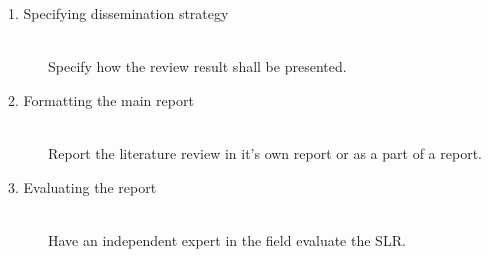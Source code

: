\begin{description}

	\item[1. Specifying dissemination strategy] \hfill \\
		Specify how the review result shall be presented. 

	\item[2. Formatting the main report] \hfill \\
		Report the literature review in it's own report or as a part of a report.

	\item[3. Evaluating the report] \hfill \\
		Have an independent expert in the field evaluate the SLR. 

\end{description}

